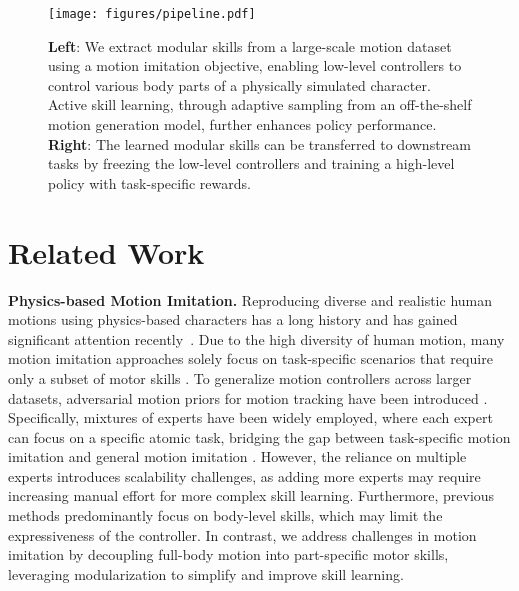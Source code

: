 \begin{figure*}[t]
    \centering
    \texttt{[image: figures/pipeline.pdf]}
    \caption{\textbf{Left}: We extract modular skills from a large-scale motion dataset using a motion imitation objective, enabling low-level controllers to control various body parts of a physically simulated character. Active skill learning, through adaptive sampling from an off-the-shelf motion generation model, further enhances policy performance. \textbf{Right}: The learned modular skills can be transferred to downstream tasks by freezing the low-level controllers and training a high-level policy with task-specific rewards.}
    \label{fig:Pipeline}
\end{figure*}

\section{Related Work}
\label{sec:related}

\textbf{Physics-based Motion Imitation.} Reproducing diverse and realistic human motions using physics-based characters has a long history and has gained significant attention recently~\cite{faloutsos2001composable, liu2010sampling, liu2005learning, liu2018learning, liu2017learning,
2018-TOG-deepMimic, 10.1145/3272127.3275014, 10.1145/3072959.3073602, zhang2023vid2player3d, 10.1145/3588432.3591525}. Due to the high diversity of human motion, many motion imitation approaches solely focus on task-specific scenarios that require only a subset of motor skills \cite{zhang2023vid2player3d, 10.1145/3588432.3591525, wang2024skillmimic, 10.1145/3450626.3459761, cui2024anyskill}. To generalize motion controllers across larger datasets, adversarial motion priors for motion tracking have been introduced \cite{Luo2023PerpetualHC, 10.1145/3450626.3459670}. Specifically, mixtures of experts have been widely employed, where each expert can focus on a specific atomic task, bridging the gap between task-specific motion imitation and general motion imitation \cite{10.5555/3454287.3454618, ScaDiver, Luo2023PerpetualHC, wagener2022mocapact, Luo2022FromUH}. However, the reliance on multiple experts introduces scalability challenges, as adding more experts may require increasing manual effort for more complex skill learning. Furthermore, previous methods predominantly focus on body-level skills, which may limit the expressiveness of the controller. In contrast, we address challenges in motion imitation by decoupling full-body motion into part-specific motor skills, leveraging modularization to simplify and improve skill learning.\\


